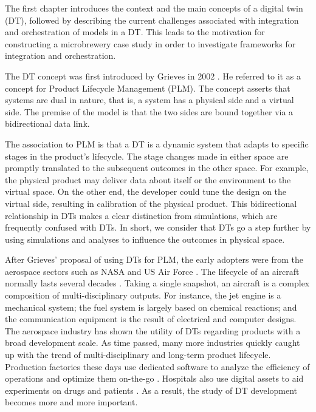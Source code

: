 The first chapter introduces the context and the main concepts of a digital twin (DT), followed by describing the current challenges associated with integration and orchestration of models in a DT. This leads to the motivation for constructing a microbrewery case study in order to investigate frameworks for integration and orchestration.

The DT concept was first introduced by Grieves in 2002 \cite{Grieves2019}. He referred to it as a concept for Product Lifecycle Management (PLM). The concept asserts that systems are dual in nature, that is, a system has a physical side and a virtual side. The premise of the model is that the two sides are bound together via a bidirectional data link.

The association to PLM is that a DT is a dynamic system that adapts to specific stages in the product's lifecycle. The stage changes made in either space are promptly translated to the subsequent outcomes in the other space. For example, the physical product may deliver data about itself or the environment to the virtual space. On the other end, the developer could tune the design on the virtual side, resulting in calibration of the physical product. This bidirectional relationship in DTs makes a clear distinction from simulations, which are frequently confused with DTs. In short, we consider that DTs go a step further by using simulations and analyses to influence the outcomes in physical space.

After Grieves' proposal of using DTs for PLM, the early adopters were from the aerospace sectors such as NASA and US Air Force \cite{Grieves2019}. The lifecycle of an aircraft normally lasts several decades \cite{boeing}. Taking a single snapshot, an aircraft is a complex composition of multi-disciplinary outputs. For instance, the jet engine is a mechanical system; the fuel system is largely based on chemical reactions; and the communication equipment is the result of electrical and computer designs. The aerospace industry has shown the utility of DTs regarding products with a broad development scale. As time passed, many more industries quickly caught up with the trend of multi-disciplinary and long-term product lifecycle. Production factories these days use dedicated software to analyze the efficiency of operations and optimize them on-the-go \cite{Zheng2018}. Hospitals also use digital assets to aid experiments on drugs and patients \cite{Kwon2022}. As a result, the study of DT development becomes more and more important.

